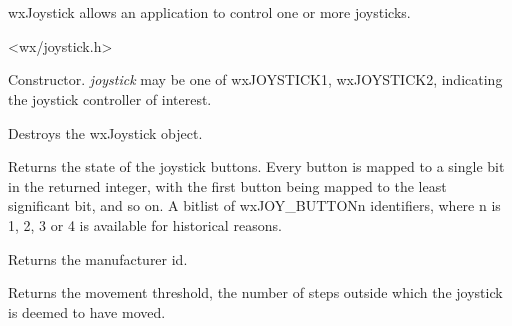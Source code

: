 \section{}\label{wxjoystick}

wxJoystick allows an application to control one or more joysticks.




<wx/joystick.h>




\label{wxjoystickctor}


Constructor. {\it joystick} may be one of wxJOYSTICK1, wxJOYSTICK2, indicating the joystick
controller of interest.

\label{wxjoystickdtor}


Destroys the wxJoystick object.

\label{wxjoystickgetbuttonstate}


Returns the state of the joystick buttons. Every button is mapped to a single
bit in the returned integer, with the first button being mapped to the least
significant bit, and so on.
A bitlist of wxJOY\_BUTTONn identifiers, where n is 1, 2, 3 or 4 
is available for historical reasons.

\label{wxjoystickgetmanufacturerid}


Returns the manufacturer id.

\label{wxjoystickgetmovementthreshold}


Returns the movement threshold, the number of steps outside which the joystick is deemed to have
moved.

